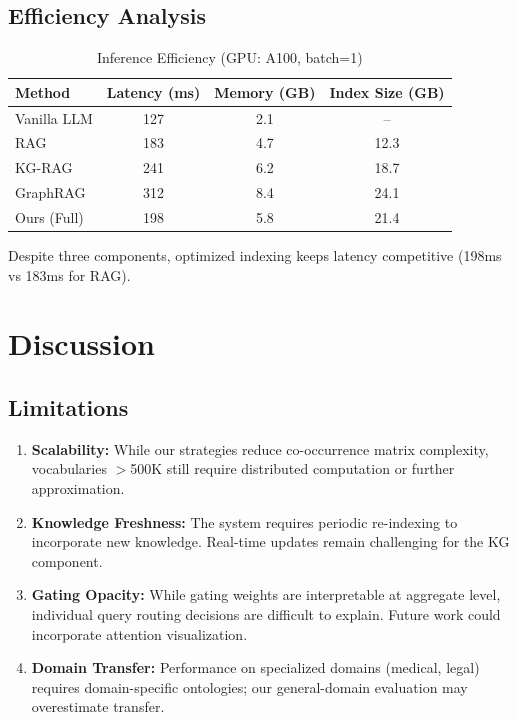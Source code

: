 \documentclass[conference]{IEEEtran}
\begin{document}
\subsection{Efficiency Analysis}

\begin{table}[h]
\centering
\caption{Inference Efficiency (GPU: A100, batch=1)}
\label{tab:efficiency}
\begin{tabular}{lccc}
\toprule
\textbf{Method} & \textbf{Latency (ms)} & \textbf{Memory (GB)} & \textbf{Index Size (GB)} \\
\midrule
Vanilla LLM & 127 & 2.1 & -- \\
RAG & 183 & 4.7 & 12.3 \\
KG-RAG & 241 & 6.2 & 18.7 \\
GraphRAG & 312 & 8.4 & 24.1 \\
Ours (Full) & 198 & 5.8 & 21.4 \\
\bottomrule
\end{tabular}
\end{table}

Despite three components, optimized indexing keeps latency competitive (198ms vs 183ms for RAG).

\section{Discussion}

\subsection{Limitations}

\begin{enumerate}[leftmargin=*]
    \item \textbf{Scalability:} While our strategies reduce co-occurrence matrix complexity, vocabularies $>$500K still require distributed computation or further approximation.
    
    \item \textbf{Knowledge Freshness:} The system requires periodic re-indexing to incorporate new knowledge. Real-time updates remain challenging for the KG component.
    
    \item \textbf{Gating Opacity:} While gating weights are interpretable at aggregate level, individual query routing decisions are difficult to explain. Future work could incorporate attention visualization.
    
    \item \textbf{Domain Transfer:} Performance on specialized domains (medical, legal) requires domain-specific ontologies; our general-domain evaluation may overestimate transfer.
\end{enumerate}
\end{document}
